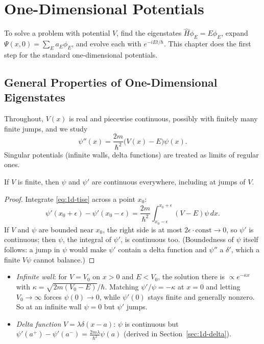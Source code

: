 \chapter{One-Dimensional Potentials}
\label{ch:1d}

To solve a problem with potential $V$, find the eigenstates $\hat{H}\phi_E = E\phi_E$, expand $\Psi(x,0) = \sum_Ea_E\phi_E$, and evolve each with $e^{-iEt/\hbar}$. This chapter does the first step for the standard one-dimensional potentials.

\section{General Properties of One-Dimensional Eigenstates}
\label{sec:1d-general}

Throughout, $V(x)$ is real and piecewise continuous, possibly with finitely many finite jumps, and we study
\begin{equation}
    \psi''(x) = \frac{2m}{\hbar^2}\bigl(V(x)-E\bigr)\psi(x).
    \label{eq:1d-tise}
\end{equation}
Singular potentials (infinite walls, delta functions) are treated as limits of regular ones.

\begin{theorem}
If $V$ is finite, then $\psi$ and $\psi'$ are continuous everywhere, including at jumps of $V$.
\end{theorem}
\begin{proof}
Integrate \eqref{eq:1d-tise} across a point $x_0$:
\[
    \psi'(x_0+\epsilon) - \psi'(x_0-\epsilon) = \frac{2m}{\hbar^2}\int_{x_0-\epsilon}^{x_0+\epsilon}(V-E)\psi\,dx .
\]
If $V$ and $\psi$ are bounded near $x_0$, the right side is at most $2\epsilon\cdot\text{const}\to0$, so $\psi'$ is continuous; then $\psi$, the integral of $\psi'$, is continuous too. (Boundedness of $\psi$ itself follows: a jump in $\psi$ would make $\psi'$ contain a delta function and $\psi''$ a $\delta'$, which a finite $V\psi$ cannot balance.)
\end{proof}

\begin{fact}
\leavevmode
\begin{itemize}
    \item \emph{Infinite wall}: for $V = V_0$ on $x>0$ and $E<V_0$, the solution there is $\propto e^{-\kappa x}$ with $\kappa = \sqrt{2m(V_0-E)}/\hbar$. Matching $\psi'/\psi = -\kappa$ at $x = 0$ and letting $V_0\to\infty$ forces $\psi(0)\to0$, while $\psi'(0)$ stays finite and generally nonzero. So at an infinite wall $\psi = 0$ but $\psi'$ jumps.
    \item \emph{Delta function} $V = \lambda\delta(x-a)$: $\psi$ is continuous but $\psi'(a^+) - \psi'(a^-) = \frac{2m\lambda}{\hbar^2}\psi(a)$ (derived in Section~\ref{sec:1d-delta}).
\end{itemize}
\end{fact}

